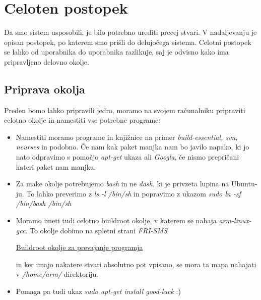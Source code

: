 \documentclass[10pt,a4paper]{article}
\begin{document}
\newpage
\section{Celoten postopek}
Da smo sistem usposobili, je bilo potrebno urediti precej stvari. V nadaljevanju je opisan postopek, po katerem smo prišli do delujočega sistema. Celotni postopek se lahko od uporabnika do uporabnika razlikuje, saj je odvisno kako ima pripravljeno delovno okolje. 

\subsection{Priprava okolja}
Preden bomo lahko pripravili jedro, moramo na svojem računalniku pripraviti celotno okolje in namestiti vse potrebne programe:
\begin{itemize}
	\item Namestiti moramo programe in knjižnice na primer \emph{build-essential, svn, ncurses} in podobno. Če nam kak paket manjka nam bo javilo napako, ki jo nato odpravimo s pomočjo \emph{apt-get} ukaza ali \emph{Googla}, če nismo prepričani kateri paket nam manjka.
	\item Za make okolje potrebujemo \emph{bash} in ne \emph{dash}, ki je privzeta lupina na Ubuntu-ju. To lahko preverimo z \emph{ls -l /bin/sh} in popravimo z ukazom \emph{sudo ln -sf /bin/bash /bin/sh}
	\item Moramo imeti tudi celotno buildroot okolje, v katerem se nahaja \emph{arm-linux-gcc}. To okolje dobimo na spletni strani \emph{FRI-SMS} 
		\begin{center}
			\href{http://laps.fri.uni-lj.si/fri-sms/programje.php}{Buildroot okolje za prevajanje programja}
		\end{center}
		in ker imajo nakatere stvari absolutno pot vpisano, se mora ta mapa nahajati v \emph{/home/arm/} direktoriju.
	\item Pomaga pa tudi ukaz \emph{sudo apt-get install good-luck} :)
\end{itemize}
\end{document}
